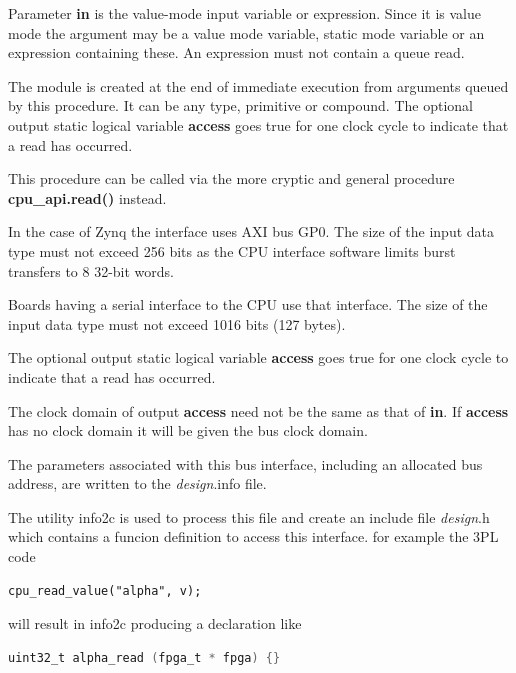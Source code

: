             Parameter {\bf in} is the value-mode input variable or expression.
            Since it is value mode the argument may be a value mode variable,
            static mode variable or an expression containing these. An expression
            must not contain a queue read.            
            
            The module is created at the end of immediate execution from arguments
            queued by this procedure. It can be any type, primitive or compound. The
            optional output static logical variable {\bf access} goes true for one
            clock cycle to indicate that a read has occurred.
            
            This procedure can be called via the more cryptic and general
            procedure {\bf cpu\_api.read()}  instead.
            
            In the case of Zynq the interface uses AXI bus GP0.            
            The size of the input data type must not exceed 256 bits as the CPU
            interface software limits burst transfers to 8 32-bit words.
            
            Boards having a serial interface to the CPU use that interface.
            The size of the input data type must not exceed 1016 bits (127 bytes).
            

            The optional output static logical variable {\bf access} goes true
            for one clock cycle to indicate that a read has occurred.
            
            The clock domain of output {\bf access} need not be the same as
            that of {\bf in}. If {\bf access} has no clock domain it will be
            given the bus clock domain.
            
            The parameters associated with this bus interface, including an
            allocated bus address, are written
            to the {\em design}.info file.

            The utility info2c is used to process this file and create
            an include file {\em design}.h which contains a funcion
            definition to access this interface. for example the 3PL
            code
            \begin{lstlisting}[gobble=12, language=threepl]
               cpu_read_value("alpha", v);
            \end{lstlisting}
            will result in info2c producing a declaration like
            \begin{lstlisting}[gobble=12, language=C]
               uint32_t alpha_read (fpga_t * fpga) {}
            \end{lstlisting}
            
